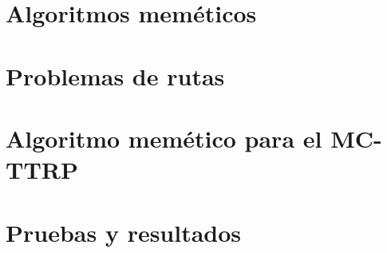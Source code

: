 \documentclass[a4paper]{article}
\begin{document}
\section{Algoritmos meméticos}

\section{Problemas de rutas}

\section{Algoritmo memético para el MC-TTRP}

\section{Pruebas y resultados}
\end{document}
